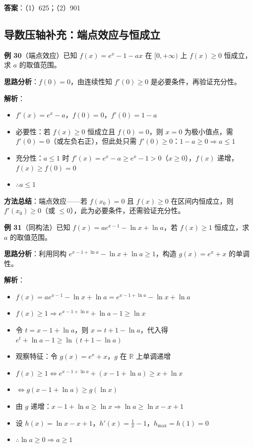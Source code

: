 \textbf{答案}：（1）625；（2）901

\subsection{导数压轴补充：端点效应与恒成立}

\textbf{例 30}（端点效应）已知 $f(x)=e^x-1-ax$ 在 $[0,+\infty)$ 上 $f(x)\ge0$ 恒成立，求 $a$ 的取值范围。

\textbf{思路分析}：$f(0)=0$，由连续性知 $f'(0)\ge0$ 是必要条件，再验证充分性。

\textbf{解析}：
\begin{itemize}
  \item $f'(x)=e^x-a$，$f(0)=0$，$f'(0)=1-a$
  \item 必要性：若 $f(x)\ge0$ 恒成立且 $f(0)=0$，则 $x=0$ 为极小值点，需 $f'(0)=0$（或左负右正），但此处只需 $f'(0)\ge0$：$1-a\ge0\Rightarrow a\le1$
  \item 充分性：$a\le1$ 时 $f'(x)=e^x-a\ge e^x-1>0$（$x\ge0$），$f(x)$ 递增，$f(x)\ge f(0)=0$
  \item $\therefore a\le1$
\end{itemize}

\textbf{方法总结}：端点效应——若 $f(x_0)=0$ 且 $f(x)\ge0$ 在区间内恒成立，则 $f'(x_0)\ge0$（或 $\le0$），此为必要条件，还需验证充分性。

\textbf{例 31}（同构法）已知 $f(x)=ae^{x-1}-\ln x+\ln a$，若 $f(x)\ge1$ 恒成立，求 $a$ 的取值范围。

\textbf{思路分析}：利用同构 $e^{x-1+\ln a}-\ln x+\ln a\ge1$，构造 $g(x)=e^x+x$ 的单调性。

\textbf{解析}：
\begin{itemize}
  \item $f(x)=ae^{x-1}-\ln x+\ln a = e^{x-1+\ln a}-\ln x+\ln a$
  \item $f(x)\ge1 \Rightarrow e^{x-1+\ln a}+\ln a -1 \ge \ln x$
  \item 令 $t=x-1+\ln a$，则 $x=t+1-\ln a$，代入得 $e^t+\ln a-1 \ge \ln(t+1-\ln a)$
  \item 观察特征：令 $g(x)=e^x+x$，$g$ 在 $\mathbb{R}$ 上单调递增
  \item $f(x)\ge1 \iff e^{x-1+\ln a}+(x-1+\ln a) \ge x+\ln x$
  \item $\iff g(x-1+\ln a) \ge g(\ln x)$
  \item 由 $g$ 递增：$x-1+\ln a \ge \ln x \Rightarrow \ln a \ge \ln x - x +1$
  \item 设 $h(x)=\ln x - x +1$，$h'(x)=\frac1x-1$，$h_{\max}=h(1)=0$
  \item $\therefore \ln a \ge 0 \Rightarrow a \ge 1$
\end{itemize}

